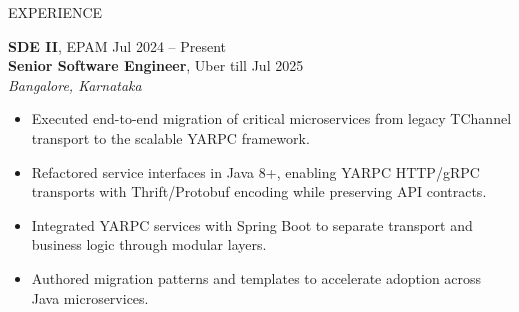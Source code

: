 \documentclass{resume} %
\begin{document}
\begin{rSection}{EXPERIENCE}

\textbf{SDE II}, EPAM \hfill Jul 2024 -- Present\\
\textbf{Senior Software Engineer}, Uber \hfill till Jul 2025\\
 \hfill \textit{Bangalore, Karnataka}
 \begin{itemize}
    \itemsep -6pt
    \item Executed end-to-end migration of critical microservices from legacy TChannel transport to the scalable YARPC framework.
    \item Refactored service interfaces in Java 8+, enabling YARPC HTTP/gRPC transports with Thrift/Protobuf encoding while preserving API contracts.
    \item Integrated YARPC services with Spring Boot to separate transport and business logic through modular layers.
    \item Authored migration patterns and templates to accelerate adoption across Java microservices.
 \end{itemize}


\end{rSection}
\end{document}

